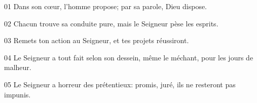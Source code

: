 01 Dans son cœur, l’homme propose; par sa parole, Dieu dispose.

02 Chacun trouve sa conduite pure, mais le Seigneur pèse les esprits.

03 Remets ton action au Seigneur, et tes projets réussiront.

04 Le Seigneur a tout fait selon son dessein, même le méchant, pour les jours de malheur.

05 Le Seigneur a horreur des prétentieux: promis, juré, ils ne resteront pas impunis.

